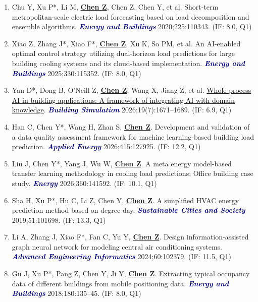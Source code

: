 \documentclass[11pt,a4paper]{article}
\newcommand{\me}[1]{\underline{\textbf{#1}}}
\newcommand{\journal}[1]{\textcolor{darkblue}{\textbf{\textit{#1}}}}
\begin{document}
\begin{enumerate}[itemsep=1pt]
\item Chu Y, Xu P*, Li M, \me{Chen Z}, Chen Z, Chen Y, et al. Short-term metropolitan-scale electric load forecasting based on load decomposition and ensemble algorithms. \journal{Energy and Buildings} 2020;225:110343. (IF: 8.0, Q1)

\item Xiao Z, Zhang J*, Xiao F*, \me{Chen Z}, Xu K, So PM, et al. An AI-enabled optimal control strategy utilizing dual-horizon load predictions for large building cooling systems and its cloud-based implementation. \journal{Energy and Buildings} 2025;330:115352. (IF: 8.0, Q1)

\item Yan D*, Dong B, O'Neill Z, \me{Chen Z}, Wang X, Jiang Z, et al. \href{https://doi.org/10.1007/s12273-026-1487-z}{\textcolor{black}{Whole-process AI in building applications: A framework of integrating AI with domain knowledge}}. \journal{Building Simulation} 2026;19(7):1671--1689. (IF: 6.9, Q1)

\item Han C, Chen Y*, Wang H, Zhan S, \me{Chen Z}. Development and validation of a data quality assessment framework for machine learning-based building load prediction. \journal{Applied Energy} 2026;415:127925. (IF: 12.2, Q1)

\item Liu J, Chen Y*, Yang J, Wu W, \me{Chen Z}. A meta energy model-based transfer learning methodology in cooling load predictions: Office building case study. \journal{Energy} 2026;360:141592. (IF: 10.1, Q1)

\item Sha H, Xu P*, Hu C, Li Z, Chen Y, \me{Chen Z}. A simplified HVAC energy prediction method based on degree-day. \journal{Sustainable Cities and Society} 2019;51:101698. (IF: 13.3, Q1)

\item Li A, Zhang J, Xiao F*, Fan C, Yu Y, \me{Chen Z}. Design information-assisted graph neural network for modeling central air conditioning systems. \journal{Advanced Engineering Informatics} 2024;60:102379. (IF: 11.5, Q1)

\item Gu J, Xu P*, Pang Z, Chen Y, Ji Y, \me{Chen Z}. Extracting typical occupancy data of different buildings from mobile positioning data. \journal{Energy and Buildings} 2018;180:135--45. (IF: 8.0, Q1)
\end{enumerate}
\end{document}
